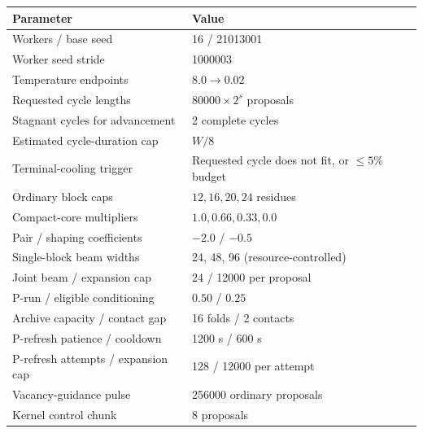 \begin{tabular}{@{}ll@{}}
\toprule
Parameter & Value \\
\midrule
Workers / base seed & 16 / 21013001 \\
Worker seed stride & 1000003 \\
Temperature endpoints & $8.0\rightarrow0.02$ \\
Requested cycle lengths & $80000\times2^s$ proposals \\
Stagnant cycles for advancement & 2 complete cycles \\
Estimated cycle-duration cap & $W/8$ \\
Terminal-cooling trigger & Requested cycle does not fit, or $\leq5\%$ budget \\
Ordinary block caps & $12,16,20,24$ residues \\
Compact-core multipliers & $1.0,0.66,0.33,0.0$ \\
Pair / shaping coefficients & $-2.0$ / $-0.5$ \\
Single-block beam widths & 24, 48, 96 (resource-controlled) \\
Joint beam / expansion cap & 24 / 12000 per proposal \\
P-run / eligible conditioning & $0.50$ / $0.25$ \\
Archive capacity / contact gap & 16 folds / 2 contacts \\
P-refresh patience / cooldown & 1200 s / 600 s \\
P-refresh attempts / expansion cap & 128 / 12000 per attempt \\
Vacancy-guidance pulse & 256000 ordinary proposals \\
Kernel control chunk & 8 proposals \\
\bottomrule
\end{tabular}
